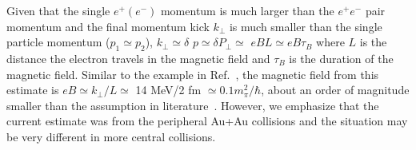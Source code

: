 \documentclass[twocolumn,epjc3]{svjour3}\sloppy
\begin{document}
Given that the single $e^+(e^-)$ momentum is much larger than the $e^+e^-$ pair momentum and the final momentum kick $k_{\perp}$ is much smaller than the single particle momentum ($p_1\simeq p_2$), $k_{\perp} \simeq \delta$ $p\simeq\delta P_{\perp}\simeq$ $e B L \simeq e B \tau_B$ where $L$ is the distance the electron travels in the magnetic field and $\tau_B$ is the duration of the magnetic field. 
Similar to the example in Ref.~\cite{TuchinPhysRevC.82.034904}, the magnetic field from this estimate is $e B \simeq k_{\perp}/L\simeq$ 14 MeV/2 fm $\simeq0.1m_{\pi}^2/\hbar$, about an order of magnitude smaller than the assumption in literature~\cite{TuchinPhysRevC.82.034904}. 
However, we emphasize that the current estimate was from the peripheral Au+Au collisions and the situation may be very different in more central collisions. 

\end{document}
